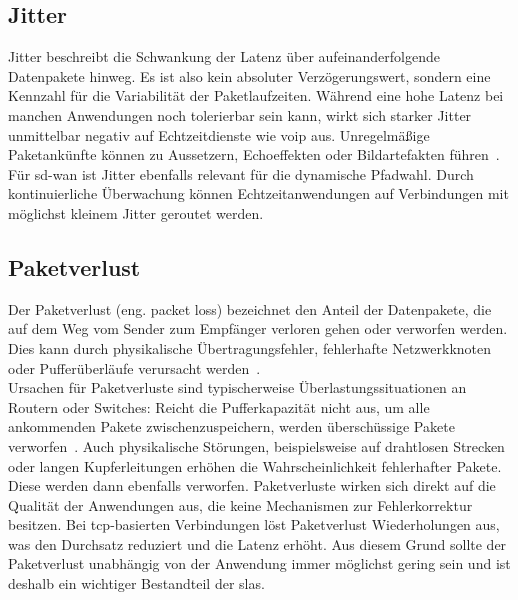 \subsection*{Jitter}
Jitter beschreibt die Schwankung der Latenz über aufeinanderfolgende Datenpakete hinweg. Es ist also kein absoluter Verzögerungswert, sondern eine Kennzahl für die Variabilität der Paketlaufzeiten. Während eine hohe Latenz bei manchen Anwendungen noch tolerierbar sein kann, wirkt sich starker Jitter unmittelbar negativ auf Echtzeitdienste wie \ac{voip} aus. Unregelmäßige Paketankünfte können zu Aussetzern, Echoeffekten oder Bildartefakten führen~\cite[69]{kuroseComputernetzwerkeTopDownAnsatz2014}.\\
Für \ac{sd-wan} ist Jitter ebenfalls relevant für die dynamische Pfadwahl. Durch kontinuierliche Überwachung können Echtzeitanwendungen auf Verbindungen mit möglichst kleinem Jitter geroutet werden.

\subsection*{Paketverlust}
Der Paketverlust (eng. packet loss) bezeichnet den Anteil der Datenpakete, die auf dem Weg vom Sender zum Empfänger verloren gehen oder verworfen werden. Dies kann durch physikalische Übertragungsfehler, fehlerhafte Netzwerkknoten oder Pufferüberläufe verursacht werden~\cite[76]{kuroseComputernetzwerkeTopDownAnsatz2014}.\\
Ursachen für Paketverluste sind typischerweise Überlastungssituationen an Routern oder Switches: Reicht die Pufferkapazität nicht aus, um alle ankommenden Pakete zwischenzuspeichern, werden überschüssige Pakete verworfen~\cite{tanenbaumComputernetzwerke2012}. Auch physikalische Störungen, beispielsweise auf drahtlosen Strecken oder langen Kupferleitungen erhöhen die Wahrscheinlichkeit fehlerhafter Pakete. Diese werden dann ebenfalls verworfen. Paketverluste wirken sich direkt auf die Qualität der Anwendungen aus, die keine Mechanismen zur Fehlerkorrektur besitzen. Bei \ac{tcp}-basierten Verbindungen löst Paketverlust Wiederholungen aus, was den Durchsatz reduziert und die Latenz erhöht. Aus diesem Grund sollte der Paketverlust unabhängig von der Anwendung immer möglichst gering sein und ist deshalb ein wichtiger Bestandteil der \acp{sla}.